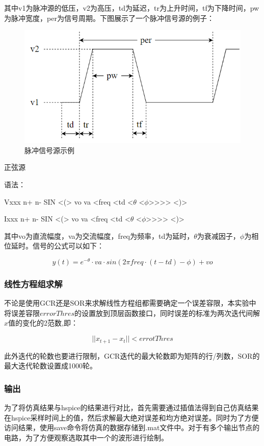 \documentclass[12pt]{article}
\begin{document}
其中v1为脉冲源的低压，v2为高压，td为延迟，tr为上升时间，tf为下降时间，pw为脉冲宽度，per为信号周期。下图展示了一个脉冲信号源的例子：

\begin{figure}
  \centering
  \includegraphics[width=15cm]{figure/pulse.png}
  \caption{脉冲信号源示例}
\end{figure}

\qquad 正弦源

语法：

Vxxx n+ n- SIN <(> vo va <freq <td <$\theta$ <$\phi$>>>> <)>

Ixxx n+ n- SIN <(> vo va <freq <td <$\theta$ <$\phi$>>>> <)>

其中vo为直流幅度，va为交流幅度，freq为频率，td为延时，$\theta$为衰减因子，$\phi$为相位延时。信号的公式可以如下：

\begin{equation}
  y(t) = e^{-\theta}\cdot va \cdot sin(2\pi freq \cdot(t-td) - \phi) + vo
\end{equation}


\subsubsection{线性方程组求解}
不论是使用GCR还是SOR来求解线性方程组都需要确定一个误差容限，本实验中将误差容限$errorThres$的设置放到顶层函数接口，同时误差的标准为两次迭代间解$x$值的变化的2范数,即：

\begin{equation}
  ||x_{t+1} - x_{t}|| < errotThres
\end{equation}

此外迭代的轮数也要进行限制，GCR迭代的最大轮数即为矩阵的行/列数，SOR的最大迭代轮数设置成1000轮。


\subsubsection{输出}
\qquad 为了将仿真结果与hspice的结果进行对比，首先需要通过插值法得到自己仿真结果在hspice采样时间上的值，然后求解最大绝对误差和均方绝对误差。同时为了方便访问结果，使用save命令将仿真的数据存储到.mat文件中。对于有多个输出节点的电路，为了方便观察选取其中一个的波形进行绘制。
\end{document}
